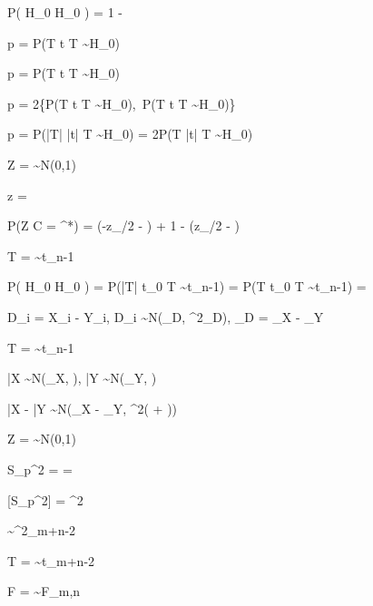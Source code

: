 \documentclass{minimal}
\begin{document}
P( H_0 \mid H_0 ) = 1 - \beta

p = P(T \geq t \mid T \sim H_0) \quad {}

p = P(T \leq t \mid T \sim H_0) \quad {}

p = 2\min\{P(T \leq t \mid T \sim H_0),\, P(T \geq t \mid T \sim H_0)\} \quad {}

p = P(|T| \geq |t| \mid T \sim H_0) = 2P(T \geq |t| \mid T \sim H_0) \quad {}

Z =  \sim N(0,1)

z = 

P(Z \in C \mid \mu = \mu^*) = \Phi\!\left(-z_{\alpha/2} - \right)
+ 1 - \Phi\!\left(z_{\alpha/2} - \right)

T =  \sim t_{n-1}

P( H_0 \mid H_0 ) = P(|T| \geq t_0 \mid T \sim t_{n-1}) = \alpha
\implies P(T \geq t_0 \mid T \sim t_{n-1}) = 

D_i = X_i - Y_i, \quad D_i \sim N(\mu_D, \sigma^2_D), \quad \mu_D = \mu_X - \mu_Y

T =  \sim t_{n-1}

\bar{X} \sim N\!\left(\mu_X, \right), \quad \bar{Y} \sim N\!\left(\mu_Y, \right)

\bar{X} - \bar{Y} \sim N\!\left(\mu_X - \mu_Y,\; \sigma^2\!\left( + \right)\right)

Z =  \sim N(0,1)

S_p^2 = 
= 

[S_p^2] = \sigma^2

 \sim \chi^2_{m+n-2}

T =  \sim t_{m+n-2}

F =  \sim F_{m,n}
\end{document}
